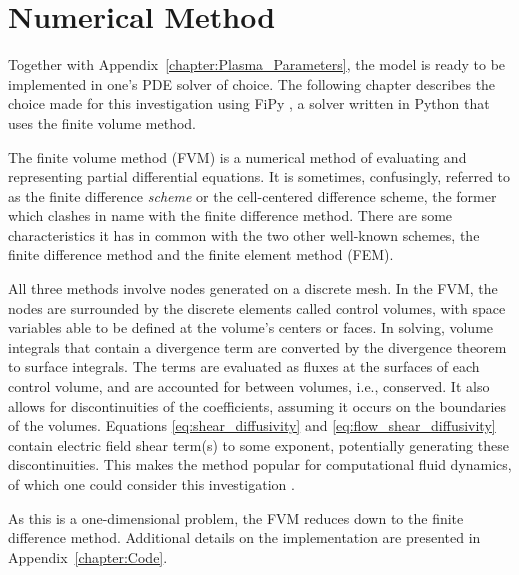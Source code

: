 \section{Numerical Method}\label{sec:numerical_method}
Together with Appendix~\ref{chapter:Plasma_Parameters}, the model is ready to be implemented in one's PDE solver of choice.
The following chapter describes the choice made for this investigation using FiPy \cite{guyer_fipy:_2009}, a solver written in Python  that uses the finite volume method.

The finite volume method (FVM) is a numerical method of evaluating and representing partial differential equations.
It is sometimes, confusingly, referred to as the finite difference \emph{scheme} or the cell-centered difference scheme, the former which clashes in name with the finite difference method.
There are some characteristics it has in common with the two other well-known schemes, the finite difference method and the finite element method (FEM).

All three methods involve nodes generated on a discrete mesh.
In the FVM, the nodes are surrounded by the discrete elements called control volumes, with space variables able to be defined at the volume's centers or faces.
In solving, volume integrals that contain a divergence term are converted by the divergence theorem to surface integrals.
The terms are evaluated as fluxes at the surfaces of each control volume, and are accounted for between volumes, i.e., conserved.
It also allows for discontinuities of the coefficients, assuming it occurs on the boundaries of the volumes.
Equations \ref{eq:shear_diffusivity} and \ref{eq:flow_shear_diffusivity} contain electric field shear term(s) to some exponent, potentially generating these discontinuities.
This makes the method popular for computational fluid dynamics, of which one could consider this investigation \cite{eymard_finite_2003}.


As this is a one-dimensional problem, the FVM reduces down to the finite difference method.
Additional details on the implementation are presented in Appendix~\ref{chapter:Code}.

